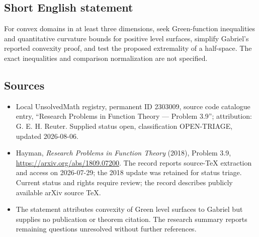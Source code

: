 \documentclass[11pt]{article}
\begin{document}
\subsection{Short English statement}
For convex domains in at least three dimensions, seek Green-function inequalities and quantitative curvature bounds for positive level surfaces, simplify Gabriel's reported convexity proof, and test the proposed extremality of a half-space. The exact inequalities and comparison normalization are not specified.
\subsection{Sources}
\begin{itemize}
\item Local UnsolvedMath registry, permanent ID 2303009, source code catalogue entry, ``Research Problems in Function Theory --- Problem 3.9''; attribution: G. E. H. Reuter. Supplied status open, classification OPEN-TRIAGE, updated 2026-08-06.
\item Hayman, \emph{Research Problems in Function Theory} (2018), Problem 3.9, \url{https://arxiv.org/abs/1809.07200}. The record reports source-TeX extraction and access on 2026-07-29; the 2018 update was retained for status triage. Current status and rights require review; the record describes publicly available arXiv source TeX.
\item The statement attributes convexity of Green level surfaces to Gabriel but supplies no publication or theorem citation. The research summary reports remaining questions unresolved without further references.
\end{itemize}
\end{document}
